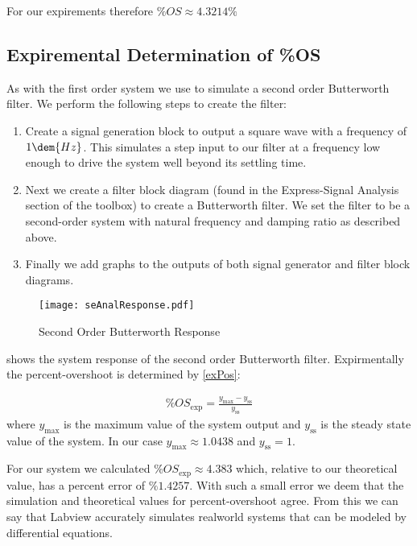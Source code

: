 \documentclass[main.tex]{subfile}
\begin{document}
For our expirements therefore $\%OS \approx 4.3214 \%$

\subsection{Expiremental Determination of \%OS}
\label{sec:expiremental_determination_of_}

As with the first order system we use \Labview to simulate a second order
Butterworth filter. We perform the following steps to create the filter: 

\begin{enumerate}
	\item Create a signal generation block to output a square wave with a
		frequency of $1\dem{Hz}$. This simulates a step input to our filter at
		a frequency low enough to drive the system well beyond its settling time.
	\item Next we create a filter block diagram (found in the Express-Signal
		Analysis section of the toolbox) to create a Butterworth filter. We set the
		filter to be a second-order system with natural frequency and damping ratio
		as described above.
	\item Finally we add graphs to the outputs of both signal generator and filter
		block diagrams.
\end{enumerate}

\begin{figure}[H]
	\begin{center}
		\texttt{[image: seAnalResponse.pdf]}
	\end{center}
	\caption{Second Order Butterworth Response}
	\label{fig:seGraph}
\end{figure}

 shows the system response of the second order Butterworth
filter. Expirmentally the percent-overshoot is determined by \eqref{exPos}:

\begin{align}
	\%OS_{\text{exp}} = \frac{y_{\text{max}} - y_{\text{ss}}}{y_{\text{ss}}}
	\label{eq:exPos}
\end{align}
where $y_{\text{max}}$ is the maximum value of the system output and
$y_{\text{ss}}$ is the steady state value of the system. In our case
$y_{\text{max}} \approx 1.0438$ and $y_{\text{ss}} = 1$.

For our system we calculated $\%OS_{\text{exp}} \approx 4.383$ which, relative
to our theoretical value, has a percent error of $\%1.4257$. With such a small
error we deem that the simulation and theoretical values for percent-overshoot
agree. From this we can say that Labview accurately simulates realworld systems
that can be modeled by differential equations.



\end{document}
